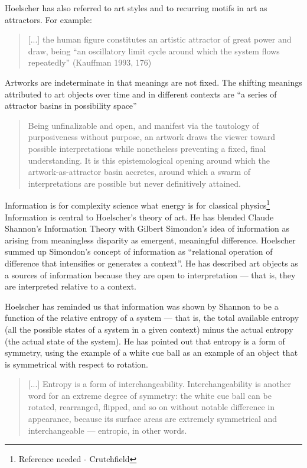 \documentclass[letterpaper]{article}
\begin{document}
    Hoelscher has also referred to art styles and to recurring motifs in art as attractors. For example:
    
    \begin{quote}
        [...] the human figure constitutes an artistic attractor of great power and draw, being “an oscillatory limit cycle around which the system flows repeatedly” (Kauffman 1993, 176) \citep[pp.11-12]{HoelscherThPtcsOfPhsSpc2014}
    \end{quote}

    Artworks are indeterminate in that meanings are not fixed. The shifting meanings attributed to art objects over time and in different contexts are “a series of attractor basins in possibility space” \citep[p.4]{HoelscherThPtcsOfPhsSpc2014}
    
    \begin{quote}
        Being unfinalizable and open, and manifest via the tautology of purposiveness without purpose, an artwork draws the viewer toward possible interpretations while nonetheless preventing a fixed, final understanding. It is this epistemological opening around which the artwork-as-attractor basin accretes, around which a swarm of interpretations are possible but never definitively attained. \citep[p.12]{HoelscherThPtcsOfPhsSpc2014}
    \end{quote}

    Information is for complexity science what energy is for classical physics\footnote{Reference needed - Crutchfield} Information is central to Hoelscher's theory of art. He has blended Claude Shannon's Information Theory with Gilbert Simondon's idea of information as arising from meaningless disparity as emergent, meaningful difference. Hoelscher summed up Simondon's concept of information as “relational operation of difference that intensifies or generates a context”. He has described art objects as a sources of information because they are open to interpretation — that is, they are interpreted relative to a context. 
    
    Hoelscher has reminded us that information was shown by Shannon to be a function of the relative entropy of a system — that is, the total available entropy (all the possible states of a system in a given context) minus the actual entropy (the actual state of the system). He has pointed out that entropy is a form of symmetry, using the example of a white cue ball as an example of an object that is symmetrical with respect to rotation.
    
    \begin{quote}
        [...] Entropy is a form of interchangeability. Interchangeability is another word for an extreme degree of symmetry: the white cue ball can be rotated, rearranged, flipped, and so on without notable difference in appearance, because its surface areas are extremely symmetrical and interchangeable — entropic, in other words.
    \end{quote}
\end{document}
